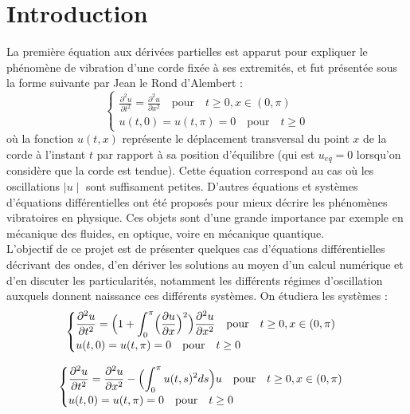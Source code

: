 \documentclass[10pt,a4paper]{article}
\begin{document}
\section{Introduction}
La première équation aux dérivées partielles est apparut pour expliquer le phénomène de vibration d'une corde fixée à ses extremités, et fut présentée sous la forme suivante par Jean le Rond d'Alembert :
\begin{equation} \label{Ondes} 
\begin{cases} 
\displaystyle \frac {\partial ^2 u } {\partial t ^2} = \frac {\partial ^2 u } {\partial x ^2}  \quad  \text{pour}\quad t\ge 0, x\in (0,\pi ) \\ u(t, 0)= u (t, \pi )= 0\quad  \text{pour} \quad t\ge 0
\end{cases} 
\end{equation} 
où la fonction $u(t, x)$ représente le déplacement transversal du point $x$ de la corde à l'instant $t$ par rapport à sa position d'équilibre (qui est $u_{eq} = 0$ lorsqu'on considère que la corde est tendue). Cette équation correspond au cas où les oscillations $\mid u\mid$ sont suffisament petites.
D'autres équations et systèmes d'équations différentielles ont été proposés pour mieux décrire les phénomènes vibratoires en physique. Ces objets sont d'une grande importance par exemple en mécanique des fluides, en optique, voire en mécanique quantique.\\
L'objectif de ce projet est de présenter quelques cas d'équations différentielles décrivant des ondes, d'en dériver les solutions au moyen d'un calcul numérique et d'en discuter les particularités, notamment les différents régimes d'oscillation auxquels donnent naissance ces différents systèmes.
On étudiera les systèmes :
\begin{equation} \label{KC} 
\begin{cases} 
\displaystyle \frac {\partial ^2 u } {\partial t ^2} =  \Bigl( 1+ \int _0^\pi  \Bigl( \frac {\partial u} {\partial x} \Bigr)^2 \Bigr) \frac {\partial ^2 u } {\partial x ^2} \quad  \text{pour}\quad t\ge 0, x\in (0,\pi ) \\ u(t, 0)= u (t, \pi )= 0\quad  \text{pour} \quad t\ge 0
\end{cases} 
\end{equation} 



\begin{equation} \label{CHW} 
\begin{cases} 
\displaystyle \frac {\partial ^2 u } {\partial t ^2} = \frac {\partial ^2 u } {\partial x ^2} -  \Bigl( \int _0^\pi u(t,s)^2 ds \Bigr) u \quad  \text{pour}\quad t\ge 0, x\in (0,\pi ) \\ u(t, 0)= u (t, \pi )= 0\quad  \text{pour} \quad t\ge 0
\end{cases} 
\end{equation} 
\end{document}
